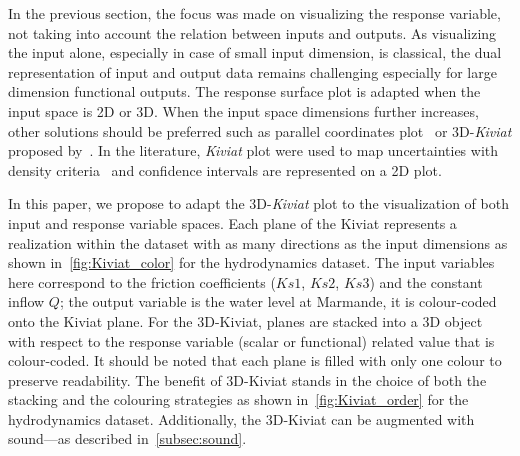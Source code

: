 In the previous section, the focus was made on visualizing the response variable, not taking into account the relation between inputs and outputs. As visualizing the input alone, especially in case of small input dimension, is classical, the dual representation of input and output data remains challenging especially for large dimension functional outputs. The response surface plot is adapted when the input space is 2D or 3D. When the input space dimensions further increases, other solutions should be preferred such as parallel coordinates plot~\cite{Inselberg1985,Inselberg2009} or 3D-\emph{Kiviat} proposed by~\citep{Hackstadt1994}. In the literature, \emph{Kiviat} plot were used to map uncertainties with density criteria~\citep{VanSomeren2016} and confidence intervals are represented on a 2D plot.

In this paper, we propose to adapt the 3D-\emph{Kiviat} plot to the visualization of both input and response variable spaces. Each plane of the Kiviat represents a realization within the dataset with as many directions as the input dimensions as shown in~\cref{fig:Kiviat_color} for the hydrodynamics dataset. The input variables here correspond to the friction coefficients ($Ks1$, $Ks2$, $Ks3$) and the constant inflow $Q$; the output variable is the water level at Marmande, it is colour-coded onto the Kiviat plane. For the 3D-Kiviat, planes are stacked into a 3D object with respect to the response variable (scalar or functional) related value that is colour-coded. It should be noted that each plane is filled with only one colour to preserve readability. The benefit of 3D-Kiviat stands in the choice of both the stacking and the colouring strategies as shown in~\cref{fig:Kiviat_order} for the hydrodynamics dataset. Additionally, the 3D-Kiviat can be augmented with sound---as described in~\cref{subsec:sound}.


